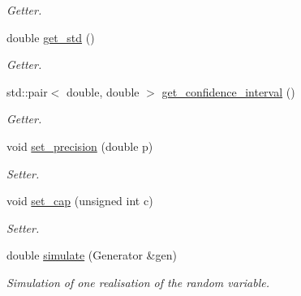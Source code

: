 \begin{DoxyCompactItemize}
\begin{DoxyCompactList}\small\item\em Getter. \end{DoxyCompactList}\item 
\mbox{\label{classmonte__carlo_afff42d06090878c287928c375e9713d2}} 
double \mbox{\hyperlink{classmonte__carlo_afff42d06090878c287928c375e9713d2}{get\+\_\+std}} ()
\begin{DoxyCompactList}\small\item\em Getter. \end{DoxyCompactList}\item 
\mbox{\label{classmonte__carlo_a1e83d23fdb90bc2680a2820151250c6f}} 
std\+::pair$<$ double, double $>$ \mbox{\hyperlink{classmonte__carlo_a1e83d23fdb90bc2680a2820151250c6f}{get\+\_\+confidence\+\_\+interval}} ()
\begin{DoxyCompactList}\small\item\em Getter. \end{DoxyCompactList}\item 
\mbox{\label{classmonte__carlo_a4630da58a98e8f080c124b6be1239849}} 
void \mbox{\hyperlink{classmonte__carlo_a4630da58a98e8f080c124b6be1239849}{set\+\_\+precision}} (double p)
\begin{DoxyCompactList}\small\item\em Setter. \end{DoxyCompactList}\item 
\mbox{\label{classmonte__carlo_aa73333519c4f888338def6b93a125304}} 
void \mbox{\hyperlink{classmonte__carlo_aa73333519c4f888338def6b93a125304}{set\+\_\+cap}} (unsigned int c)
\begin{DoxyCompactList}\small\item\em Setter. \end{DoxyCompactList}\item 
\mbox{\label{classmonte__carlo_ad4dbf4b40cadbacc3beadd7fd3721d0b}} 
double \mbox{\hyperlink{classmonte__carlo_ad4dbf4b40cadbacc3beadd7fd3721d0b}{simulate}} (Generator \&gen)
\begin{DoxyCompactList}\small\item\em Simulation of one realisation of the random variable. \end{DoxyCompactList}\item 

\end{DoxyCompactItemize}
